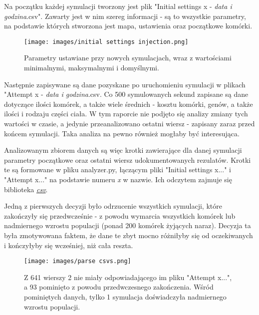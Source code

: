 \documentclass{article}
\begin{document}
Na początku każdej symulacji tworzony jest plik "Initial settings x - \textit{data i godzina}.csv". Zawarty jest w nim szereg informacji - są to wszystkie parametry, na podstawie których stworzona jest mapa, ustawienia oraz początkowe komórki.
\begin{figure}[H]
    \centering
    \texttt{[image: images/initial settings injection.png]}
    \caption{Parametry ustawiane przy nowych symulacjach, wraz z wartościami minimalnymi, maksymalnymi i domyślnymi.}    
\end{figure}

Następnie zapisywane są dane pozyskane po uruchomieniu symulacji w plikach "Attempt x - \textit{data i godzina}.csv. Co 500 symulowanych sekund zapisane są dane dotyczące ilości komórek, a także wiele średnich - kosztu komórki, genów, a także ilości i rodzaju części ciała. W tym raporcie nie podjęto się analizy zmiany tych wartości w czasie, a jedynie przeanalizowano ostatni wiersz - zapisany zaraz przed końcem symulacji. Taka analiza na pewno również mogłaby być interesująca.

Analizowanym zbiorem danych są więc krotki zawierające dla danej symulacji parametry początkowe oraz ostatni wiersz udokumentowanych rezulatów. Krotki te są formowane w pliku analyzer.py, łączącym pliki "Initial settings x..." i "Attempt x..." na podstawie numeru \textit{x} w nazwie. Ich odczytem zajmuje się biblioteka \href{https://docs.python.org/3/library/csv.html}{\textit{csv}}.

Jedną z pierwszych decyzji było odrzucenie wszystkich symulacji, które zakończyły się przedwcześnie - z powodu wymarcia wszystkich komórek lub nadmiernego wzrostu populacji (ponad 200 komórek żyjących naraz). Decyzja ta była zmotywowana faktem, że dane te zbyt mocno różniłyby się od oczekiwanych i kończyłyby się wcześniej, niż cała reszta.

\begin{figure}[H]
    \centering
    \texttt{[image: images/parse csvs.png]}
    \caption{Z 641 wierszy 2 nie miały odpowiadającego im pliku "Attempt x...", a 93 pominięto z powodu przedwczesnego zakończenia. Wśród pominiętych danych, tylko 1 symulacja doświadczyła nadmiernego wzrostu populacji.}    
\end{figure}
\end{document}
